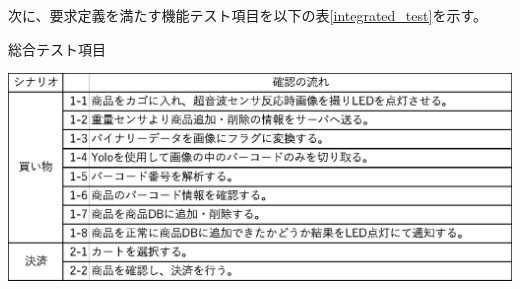 次に、要求定義を満たす機能テスト項目を以下の表\ref{integrated_test}を示す。

\begin{table}[htbp]
\centering
\caption{総合テスト項目}
\includegraphics[width=15cm]{./pic/integrated_test.eps}
\label{integrated_test}
\end{table}